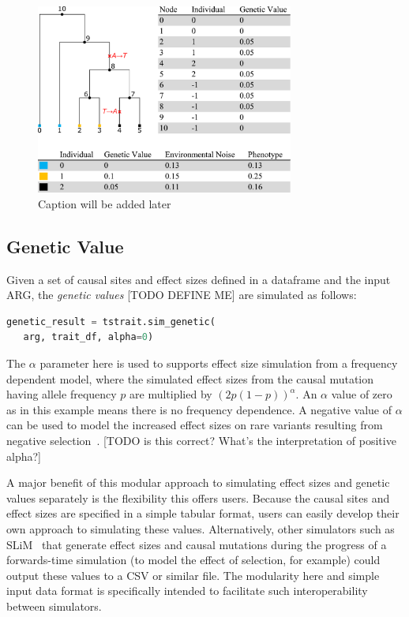 \documentclass[unnumsec,webpdf,modern,large,namedate]{oup-authoring-template}%
\begin{document}
\begin{figure}[t]%
\centering
\includegraphics[width=240pt]{figures/tree-illustration.pdf}
\caption{Caption will be added later}\label{fig:time}
\end{figure}

\subsection{Genetic Value}
Given a set of causal sites and effect sizes defined in a dataframe
and the input ARG, the \emph{genetic values} [TODO DEFINE ME]
are simulated as follows:
\begin{lstlisting}[language=Python]
genetic_result = tstrait.sim_genetic(
   arg, trait_df, alpha=0)
\end{lstlisting}
The $\alpha$ parameter here is used to
supports effect size simulation from a frequency
dependent model, where the simulated effect sizes from the causal mutation
having allele frequency $p$ are multiplied by $\left(2p(1-p)\right)^\alpha$.
An $\alpha$ value of zero as in this example means there is
no frequency dependence. A negative value of $\alpha$
can be used to model the increased effect sizes on rare variants
resulting from negative selection~\citep{speed2017}.
[TODO is this correct? What's the interpretation of positive alpha?]

A major benefit of this modular approach to simulating effect sizes
and genetic values separately is the flexibility this offers
users. Because the causal sites and effect sizes are specified in a
simple tabular format, users can easily develop their own approach
to simulating these values. Alternatively, other simulators
such as SLiM~\citep{haller2023} that generate effect sizes and
causal mutations during the progress of a forwards-time simulation
(to model the effect of selection, for example) could output these
values to a CSV or similar file. The modularity here and simple
input data format is specifically intended to facilitate such
interoperability between simulators.
\end{document}

